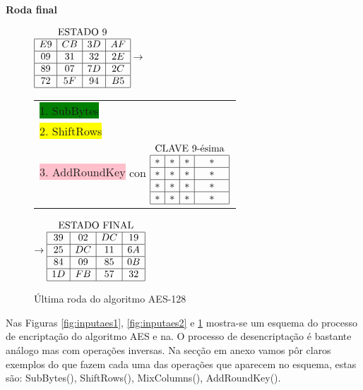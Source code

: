 \begin{center}{\bf Roda final}\end{center}
\begin{figure}[!ht]
\begin{figurebox}
\begin{center}
$\begin{array}{|c|c|c|c|}
\multicolumn{4}{c}{\text{ESTADO 9}}\\\hline
E9 & CB & 3D & AF\\\hline
09 & 31 & 32 & 2E\\\hline
89 & 07 & 7D & 2C\\\hline
72 & 5F & 94 & B5\\\hline
\end{array}\rightarrow$
\begin{tabular}{l}
\\
\colorbox{green}{1. SubBytes}\\
\colorbox{yellow}{2. ShiftRows}\\
\colorbox{pink}{3. AddRoundKey} con 
\tiny{
$\begin{array}{|c|c|c|c|}
\multicolumn{4}{c}{\text{CLAVE  9-ésima}}\\\hline
* & * & * & *\\\hline
* & * & * & *\\\hline
* & * & * & *\\\hline
* & * & * & *\\\hline
\end{array}$
}
\\
\end{tabular} $\rightarrow
\begin{array}{|c|c|c|c|}
\multicolumn{4}{c}{\text{ESTADO FINAL}}\\\hline
39 & 02 & DC & 19\\\hline
25 & DC & 11 & 6A\\\hline
84 & 09 & 85 & 0B\\\hline
1D & FB & 57 & 32\\\hline
\end{array}
$
\end{center}\caption{Última roda do algoritmo AES-128}\label{fig:inputaes3}
\end{figurebox}
\end{figure}


Nas Figuras \ref{fig:inputaes1}, \ref{fig:inputaes2} e \ref{fig:inputaes3} mostra-se um esquema do processo de encriptação do algoritmo AES e na. O processo de desencriptação é bastante análogo mas com operações inversas. Na secção em anexo vamos pôr claros exemplos do que fazem cada uma das operações que aparecem no esquema, estas são: SubBytes(), ShiftRows(), MixColumns(), AddRoundKey().


